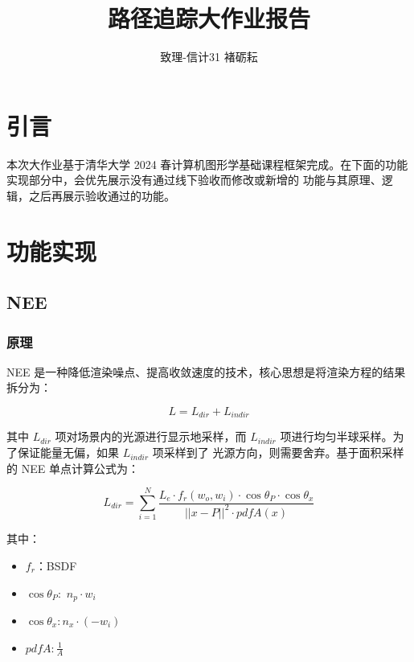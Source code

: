 \documentclass[UTF8]{ctexart}
\title{路径追踪大作业报告}
\author{致理-信计31 褚砺耘}
\begin{document}
    \maketitle
    \tableofcontents
    \newpage

    \section{引言}
    本次大作业基于清华大学 2024 春计算机图形学基础课程框架完成。在下面的功能实现部分中，会优先展示没有通过线下验收而修改或新增的
    功能与其原理、逻辑，之后再展示验收通过的功能。


    \section{功能实现}

    \subsection{NEE}

    \subsubsection{原理}

    NEE 是一种降低渲染噪点、提高收敛速度的技术，核心思想是将渲染方程的结果拆分为：

    $$
    L = L_{dir} + L_{indir}
    $$

    其中 $L_{dir}$ 项对场景内的光源进行显示地采样，而 $L_{indir}$ 项进行均匀半球采样。为了保证能量无偏，如果 $L_{indir}$ 项采样到了
    光源方向，则需要舍弃。基于面积采样的 NEE 单点计算公式为：
    
    $$
    L_{dir} = \sum_{i=1}^{N} \frac{L_e \cdot f_r(w_o, w_i)\cdot \cos \theta_P \cdot \cos \theta_x}{||x - P||^2 \cdot pdfA(x)}
    $$

    其中：

    \begin{itemize}
        \item $f_r$：BSDF

        \item $\cos \theta_P:$ $n_p \cdot w_i$
        
        \item $\cos \theta_x: n_x \cdot (-w_i)$
        
        \item $pdfA: \frac{1}{A}$
    \end{itemize}
\end{document}
